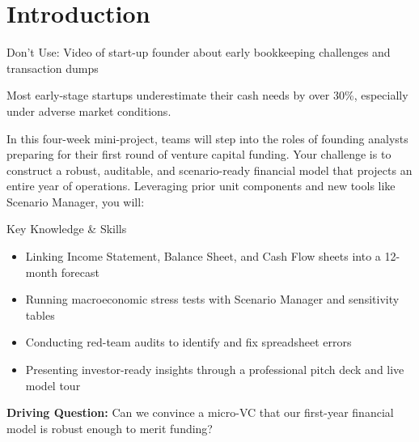 
\section{Introduction}
\begin{Replace}
Don't Use: Video of start-up founder about early bookkeeping challenges and transaction dumps
\end{Replace}

\begin{Trivia}
Most early-stage startups underestimate their cash needs by over 30\%, especially under adverse market conditions.
\end{Trivia}

In this four-week mini-project, teams will step into the roles of founding analysts preparing for their first round of venture capital funding. Your challenge is to construct a robust, auditable, and scenario-ready financial model that projects an entire year of operations. Leveraging prior unit components and new tools like Scenario Manager, you will:

\begin{skillbox}{Key Knowledge \& Skills}
\begin{itemize}
  \item Linking Income Statement, Balance Sheet, and Cash Flow sheets into a 12-month forecast
  \item Running macroeconomic stress tests with Scenario Manager and sensitivity tables
  \item Conducting red-team audits to identify and fix spreadsheet errors
  \item Presenting investor-ready insights through a professional pitch deck and live model tour
\end{itemize}
\end{skillbox}

\begin{Important}
\textbf{Driving Question:} Can we convince a micro-VC that our first-year financial model is robust enough to merit funding?
\end{Important}


\clearpage
